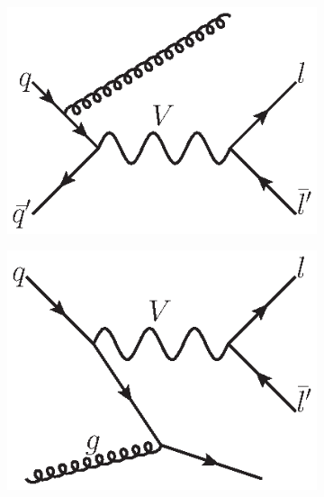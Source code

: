 \begin{figure}[!p]
    \centering
    \begin{subfigure}[b]{\SideBySidePlotWidth}
        \includegraphics[width=\linewidth]{figures/TheoryFigures/VectorBosonQToLeptonGJet.eps}
        \caption{}
        \label{fig:feyn_DYISR}
    \end{subfigure}%
    \begin{subfigure}[b]{\SideBySidePlotWidth}
        \includegraphics[width=\linewidth]{figures/TheoryFigures/VectorBosonQToLeptonqJet.eps}
        \caption{}
        \label{fig:feyn_DYQuarkRadiation}
    \end{subfigure}%
    \hfill
    \begin{subfigure}[b]{\SideBySidePlotWidth}

\end{subfigure}
\end{figure}
